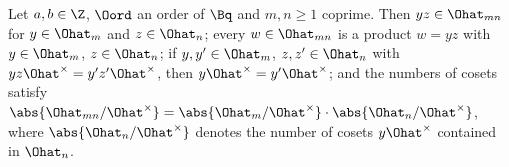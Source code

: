 Let $a,b\in\Z$, $\Oord$ an order of $\Bq$ and $m,n\ge1$ coprime. Then $yz\in\Ohat_{mn}$ for $y\in\Ohat_m$ and $z\in\Ohat_n$; every
$w\in\Ohat_{mn}$ is a product $w=yz$ with $y\in\Ohat_m$, $z\in\Ohat_n$; if $y,y'\in\Ohat_m$, $z,z'\in\Ohat_n$ with
$yz\Ohat^\times=y'z'\Ohat^\times$, then $y\Ohat^\times=y'\Ohat^\times$; and the numbers of cosets satisfy
$\abs{\Ohat_{mn}/\Ohat^\times}=\abs{\Ohat_m/\Ohat^\times}\cdot\abs{\Ohat_n/\Ohat^\times}$, where $\abs{\Ohat_n/\Ohat^\times}$ denotes the number of
cosets $y\Ohat^\times$ contained in $\Ohat_n$.
